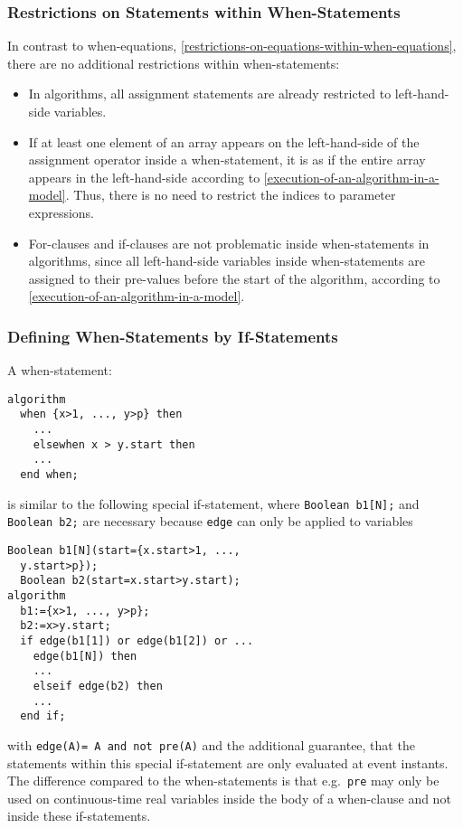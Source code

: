 \subsubsection{Restrictions on Statements within When-Statements}\label{restrictions-on-statements-within-when-statements}

\begin{nonnormative}
In contrast to when-equations, \cref{restrictions-on-equations-within-when-equations},
there are no additional restrictions within when-statements:
\begin{itemize}
\item
  In algorithms, all assignment statements are already restricted to left-hand-side variables.
\item
  If at least one element of an array appears on the left-hand-side of the assignment operator inside
  a when-statement, it is as if the entire array appears in the left-hand-side
  according to \cref{execution-of-an-algorithm-in-a-model}.
  Thus, there is no need to restrict the indices to parameter expressions.
\item
  For-clauses and if-clauses are not problematic inside when-statements in algorithms, since
  all left-hand-side variables inside when-statements are assigned to their pre-values
  before the start of the algorithm, according to \cref{execution-of-an-algorithm-in-a-model}.
\end{itemize}
\end{nonnormative}
\subsubsection{Defining When-Statements by If-Statements}\label{defining-when-statements-by-if-statements}

A when-statement:
\begin{lstlisting}[language=modelica]
algorithm
  when {x>1, ..., y>p} then
    ...
    elsewhen x > y.start then
    ...
  end when;
\end{lstlisting}
is similar to the following special if-statement, where \lstinline!Boolean b1[N];! and \lstinline!Boolean b2;! are necessary because \lstinline!edge! can
only be applied to variables
\begin{lstlisting}[language=modelica]
  Boolean b1[N](start={x.start>1, ...,
  y.start>p});
  Boolean b2(start=x.start>y.start);
algorithm
  b1:={x>1, ..., y>p};
  b2:=x>y.start;
  if edge(b1[1]) or edge(b1[2]) or ...
    edge(b1[N]) then
    ...
    elseif edge(b2) then
    ...
  end if;
\end{lstlisting}
with \lstinline!edge(A)= A and not pre(A)! and the additional guarantee, that the
statements within this special if-statement are only evaluated at event
instants. The difference compared to the when-statements is that e.g.\ \lstinline!pre! may only be used on continuous-time real variables inside the body
of a when-clause and not inside these if-statements.

